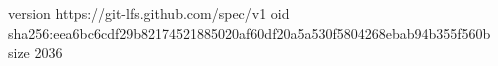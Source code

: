 version https://git-lfs.github.com/spec/v1
oid sha256:eea6bc6cdf29b82174521885020af60df20a5a530f5804268ebab94b355f560b
size 2036

